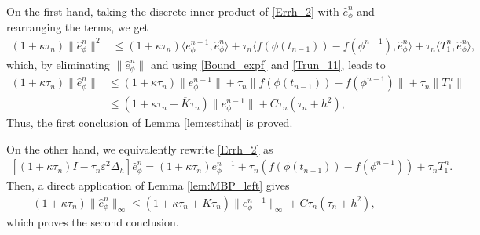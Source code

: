 \documentclass{m2an}
\begin{document}
On the first hand, taking the discrete inner product of \eqref{Errh_2} with $ \hat{e}_{\phi}^{n} $ and rearranging the terms, we get
\begin{equation*}\label{Errh_3}
	\begin{aligned}
		( 1 + \kappa \tau_{n} ) \| \hat{e}_{\phi}^{n} \|^{2} & \leq 	( 1 + \kappa \tau_{n} ) \big\langle  e_{\phi}^{n-1}, \hat{e}_{\phi}^{n} \big\rangle +  \tau_{n} \big\langle f( \phi( t_{n-1} ) ) - f( \phi^{n-1} ), \hat{e}_{\phi}^{n} \big\rangle  + \tau_{n} \big\langle T_{1}^n, \hat{e}_{\phi}^{n} \big\rangle,
	\end{aligned}
\end{equation*}
which, by eliminating $ \| \hat{e}_{\phi}^{n} \| $ and using \eqref{Bound_expf} and \eqref{Trun_11}, leads to
\begin{equation*}
	\begin{aligned}
		( 1 + \kappa \tau_{n} ) \| \hat{e}_{\phi}^{n} \| & \leq 	( 1 + \kappa \tau_{n} ) \| e_{\phi}^{n-1} \| +  \tau_{n} \| f( \phi( t_{n-1} ) ) - f( \phi^{n-1} ) \| + \tau_{n} \| T_{1}^n \| \\
		& \leq ( 1 + \kappa \tau_{n} + \overline{K} \tau_{n} ) \| e_{\phi}^{n-1} \| + C \tau_{n} ( \tau_{n} + h^2 ),
	\end{aligned}
\end{equation*}
Thus, the first conclusion of Lemma \ref{lem:estihat} is proved.

On the other hand, we equivalently rewrite \eqref{Errh_2} as
\begin{equation*}
	\begin{aligned}
		\left[ ( 1 + \kappa \tau_{n} ) I - \tau_{n} \varepsilon^2 \Delta_h \right]\hat{e}_{\phi}^{n} = ( 1 + \kappa \tau_{n} ) e_{\phi}^{n-1} + \tau_{n} ( f( \phi( t_{n-1} ) ) - f( \phi^{n-1} ) ) + \tau_{n} T_{1}^n.
	\end{aligned}
\end{equation*}
Then, a direct application of Lemma \ref{lem:MBP_left} gives
\begin{equation*}
	\begin{aligned}
		( 1 + \kappa \tau_{n} ) \| \hat{e}_{\phi}^{n} \|_{\infty} \leq ( 1 + \kappa \tau_{n} + \overline{K} \tau_{n} )  \| e_{\phi}^{n-1} \|_{\infty}  + C \tau_{n} ( \tau_{n} + h^2 ),
	\end{aligned}
\end{equation*}
which proves the second conclusion.
\end{document}
